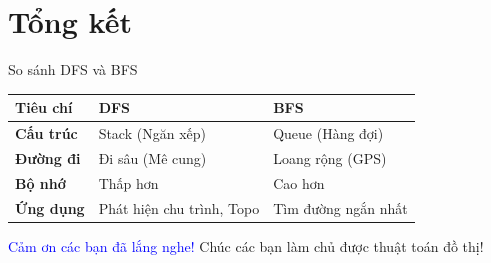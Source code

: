 \documentclass[aspectratio=169]{beamer}
\begin{document}
\section{Tổng kết}
\begin{frame}{So sánh DFS và BFS}
    \centering
    \begin{tabular}{|l|p{4cm}|p{4cm}|}
        \hline
        \textbf{Tiêu chí} & \textbf{DFS} & \textbf{BFS} \\ \hline
        \textbf{Cấu trúc} & Stack (Ngăn xếp) & Queue (Hàng đợi) \\ \hline
        \textbf{Đường đi} & Đi sâu (Mê cung) & Loang rộng (GPS) \\ \hline
        \textbf{Bộ nhớ} & Thấp hơn & Cao hơn \\ \hline
        \textbf{Ứng dụng} & Phát hiện chu trình, Topo & Tìm đường ngắn nhất \\ \hline
    \end{tabular}
\end{frame}

\begin{frame}
    \centering
    \Huge \textcolor{blue}{Cảm ơn các bạn đã lắng nghe!}
    \vspace{1cm}
    \large Chúc các bạn làm chủ được thuật toán đồ thị!
\end{frame}
\end{document}
